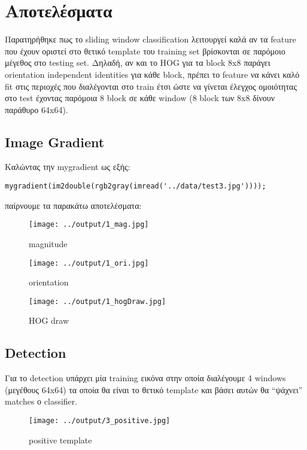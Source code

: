 \documentclass[11pt]{scrartcl} %
\begin{document}
\section{Αποτελέσματα}
Παρατηρήθηκε πως το sliding window classification λειτουργεί καλά αν τα feature που έχουν οριστεί
στο θετικό template του training set βρίσκονται σε παρόμοιο μέγεθος στο testing set. Δηλαδή, αν
και το HOG για τα block 8x8 παράγει orientation independent identities για κάθε block, πρέπει το
feature να κάνει καλό fit στις περιοχές που διαλέγονται στο train έτσι ώστε να γίνεται έλεγχος
ομοιότητας στο test έχοντας παρόμοια 8 block σε κάθε window (8 block των 8x8 δίνουν παράθυρο 64x64).

\subsection{Image Gradient}

Καλώντας την mygradient ως εξής:

\begin{verbatim}
mygradient(im2double(rgb2gray(imread('../data/test3.jpg'))));
\end{verbatim}

παίρνουμε τα παρακάτω αποτελέσματα:

\begin{figure}[H]
  \texttt{[image: ../output/1\_mag.jpg]}
  \caption{magnitude}
\end{figure}

\begin{figure}[H]
  \texttt{[image: ../output/1\_ori.jpg]}
  \caption{orientation}
\end{figure}

\begin{figure}[H]
  \texttt{[image: ../output/1\_hogDraw.jpg]}
  \caption{HOG draw}
\end{figure}

\subsection{Detection}
Για το detection υπάρχει μία training εικόνα στην οποία διαλέγουμε 4 windows (μεγέθους
64x64) τα οποία θα είναι το θετικό template και βάσει αυτών θα ``ψάχνει'' matches
ο classifier.

\begin{figure}[H]
  \texttt{[image: ../output/3\_positive.jpg]}
  \caption{positive template}
\end{figure}
\end{document}
